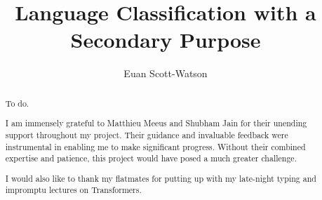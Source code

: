 \documentclass[a4paper, twoside]{report}
\title{Language Classification with a Secondary Purpose}
\author{Euan Scott-Watson}
\begin{document}


\begin{abstract}
    To do.
\end{abstract}

\renewcommand{\abstractname}{Acknowledgements}
\begin{abstract}
    I am immensely grateful to Matthieu Meeus and Shubham Jain for their unending support throughout my project. Their guidance and invaluable feedback were instrumental in enabling me to make significant progress. Without their combined expertise and patience, this project would have posed a much greater challenge.

    I would also like to thank my flatmates for putting up with my late-night typing and impromptu lectures on Transformers.
\end{abstract}

\tableofcontents













\end{document}
